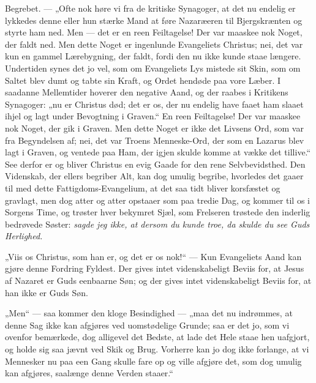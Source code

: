 \documentclass[12pt,a4paper]{book}
\begin{document}
Begrebet. --- „Ofte nok høre vi fra de kritiske Synagoger, at det nu endelig er lykkedes
denne eller hun stærke Mand at føre Nazaræeren til Bjergskrænten og styrte ham ned. Men
--- det er en reen Feiltagelse! Der var maaskee nok Noget, der faldt ned. Men dette Noget
er ingenlunde Evangeliets Christus; nei, det var kun en gammel Lærebygning, der faldt,
fordi den nu ikke kunde staae længere. Undertiden synes det jo vel, som om Evangeliets
Lys mistede sit Skin, som om Saltet blev dumt og tabte sin Kraft, og Ordet hendøde paa
vore Læber. I saadanne Mellemtider hoverer den negative Aand, og der raabes i Kritikens
Synagoger: „nu er Christus død; det er os, der nu endelig have faaet ham slaaet ihjel og
lagt under Bevogtning i Graven.“ En reen Feiltagelse! Der var maaskee nok
Noget, der gik i Graven. Men dette Noget er ikke det Livsens Ord, som var fra Begyndelsen
af; nei, det var Troens Menneske-Ord, der som en Lazarus blev lagt i Graven, og ventede
paa Ham, der igjen skulde komme at vække det tillive.“ See derfor er og bliver Christus
en evig Gaade for den rene Selvbevidsthed. Den Videnskab, der ellers begriber Alt, kan
dog umulig begribe, hvorledes det gaaer til med dette Fattigdoms-Evangelium, at det saa
tidt bliver korsfæstet og gravlagt, men dog atter og atter opstaaer som paa tredie Dag,
og kommer til os i Sorgens Time, og trøster hver bekymret Sjæl, som Frelseren trøstede
den inderlig bedrøvede Søster: \emph{sagde jeg ikke, at dersom du kunde troe, da skulde
du see Guds Herlighed.}

„Viis os Christus, som han er, og det er os nok!“ --- Kun Evangeliets Aand kan gjøre
denne Fordring Fyldest. Der gives intet videnskabeligt Beviis for, at Jesus af Nazaret er
Guds eenbaarne Søn; og der gives intet videnskabeligt Beviis for, at han ikke er Guds Søn.

„Men“ --- saa kommer den kloge Besindighed --- „maa det nu indrømmes, at denne Sag ikke
kan afgjøres ved uomstødelige Grunde; saa er det jo, som vi ovenfor bemærkede, dog
alligevel det Bedste, at lade det Hele staae hen uafgjort, og holde sig saa jævnt ved
Skik og Brug. Vorherre kan jo dog ikke forlange, at vi Mennesker nu paa een Gang skulle
fare op og ville afgjøre det, som dog umulig kan afgjøres, saalænge denne Verden staaer.“
\end{document}
